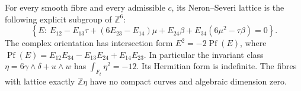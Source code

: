 \begin{proposition}\label{fam:src:D.1.4}\label{fam:st:D.1.4}
For every smooth fibre and every admissible \(c\), its Neron--Severi lattice
is the following explicit subgroup of \(\mathbb Z^6\):
\begin{equation}\label{fam:eq:cd-NS}
 \left\{E:\ E_{12}-E_{13}\tau+(6E_{23}-E_{14})\mu+
 E_{24}\beta+E_{34}(6\mu^2-\tau\beta)=0\right\}.
\end{equation}
The complex orientation has intersection form
\(E^2=-2\operatorname{Pf}(E)\), where
\(\operatorname{Pf}(E)=E_{12}E_{34}-E_{13}E_{24}+E_{14}E_{23}\).
In particular the invariant class \(\eta=6\gamma\wedge\delta+u\wedge w\)
has \(\int_{F_t}\eta^2=-12\). Its Hermitian form is indefinite.
The fibres with lattice exactly \(\mathbb Z\eta\) have no compact curves
and algebraic dimension zero.
\end{proposition}

